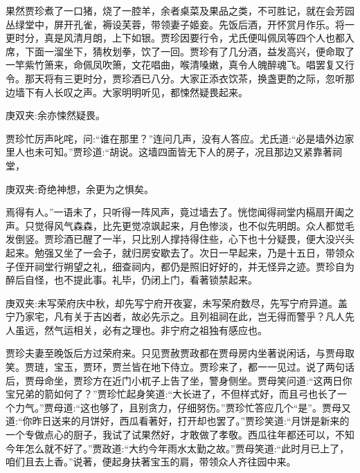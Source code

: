 \begin{parag}
    果然贾珍煮了一口猪，烧了一腔羊，余者桌菜及果品之类，不可胜记，就在会芳园丛绿堂中，屏开孔雀，褥设芙蓉，带领妻子姬妾。先饭后酒，开怀赏月作乐。将一更时分，真是风清月朗，上下如银。贾珍因要行令，尤氏便叫佩凤等四个人也都入席，下面一溜坐下，猜枚划拳，饮了一回。贾珍有了几分酒，益发高兴，便命取了一竿紫竹箫来，命佩凤吹箫，文花唱曲，喉清嗓嫩，真令人魄醉魂飞。唱罢复又行令。那天将有三更时分，贾珍酒已八分。大家正添衣饮茶，换盏更酌之际，忽听那边墙下有人长叹之声。大家明明听见，都悚然疑畏起来。\begin{note}庚双夹:余亦悚然疑畏。\end{note}贾珍忙厉声叱咤，问:“谁在那里？”连问几声，没有人答应。尤氏道:“必是墙外边家里人也未可知。”贾珍道:“胡说。这墙四面皆无下人的房子，况且那边又紧靠著祠堂，\begin{note}庚双夹:奇绝神想，余更为之惧矣。\end{note}焉得有人。”一语未了，只听得一阵风声，竟过墙去了。恍惚闻得祠堂内槅扇开阖之声。只觉得风气森森，比先更觉凉飒起来，月色惨淡，也不似先明朗。众人都觉毛发倒竖。贾珍酒已醒了一半，只比别人撑持得住些，心下也十分疑畏，便大没兴头起来。勉强又坐了一会子，就归房安歇去了。次日一早起来，乃是十五日，带领众子侄开祠堂行朔望之礼，细查祠内，都仍是照旧好好的，并无怪异之迹。贾珍自为醉后自怪，也不提此事。礼毕，仍闭上门，看著锁禁起来。\begin{note}庚双夹:未写荣府庆中秋，却先写宁府开夜宴，未写荣府数尽，先写宁府异道。盖宁乃家宅，凡有关于吉凶者，故必先示之。且列祖祠在此，岂无得而警乎？凡人先人虽远，然气运相关，必有之理也。非宁府之祖独有感应也。\end{note}
\end{parag}


\begin{parag}
    贾珍夫妻至晚饭后方过荣府来。只见贾赦贾政都在贾母房内坐著说闲话，与贾母取笑。贾琏，宝玉，贾环，贾兰皆在地下侍立。贾珍来了，都一一见过。说了两句话后，贾母命坐，贾珍方在近门小杌子上告了坐，警身侧坐。贾母笑问道:“这两日你宝兄弟的箭如何了？”贾珍忙起身笑道:“大长进了，不但样式好，而且弓也长了一个力气。”贾母道:“这也够了，且别贪力，仔细努伤。”贾珍忙答应几个“是”。贾母又道:“你昨日送来的月饼好，西瓜看著好，打开却也罢了。”贾珍笑道:“月饼是新来的一个专做点心的厨子，我试了试果然好，才敢做了孝敬。西瓜往年都还可以，不知今年怎么就不好了。”贾政道:“大约今年雨水太勤之故。”贾母笑道:“此时月已上了，咱们且去上香。”说著，便起身扶著宝玉的肩，带领众人齐往园中来。
\end{parag}


